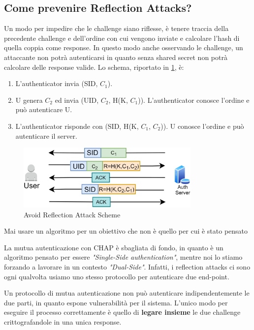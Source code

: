 \subsection{Come prevenire Reflection Attacks?}
Un modo per impedire che le challenge siano riflesse, è tenere traccia della precedente challenge e dell'ordine con cui vengono inviate e calcolare l'hash di quella coppia come response. In questo modo anche osservando le challenge, un attaccante non potrà autenticarsi in quanto senza shared secret non potrà calcolare delle response valide. Lo schema, riportato in \cref{fig:reflectionavoid}, è:
\begin{enumerate}
    \item L'authenticator invia (SID, $C_1$).
    \item U genera $C_2$ ed invia (UID, $C_2$, H(K, $C_1$)). L'authenticator conosce l'ordine e può autenticare U.
    \item L'authenticator risponde con (SID, H(K, $C_1$, $C_2$)). U conosce l'ordine e può autenticare il server.
\end{enumerate}
\begin{figure}[ht]
    \centering
    \includegraphics[width=0.8\textwidth]{image/reflectionavoid.png}
    \caption{Avoid Reflection Attack Scheme}
    \label{fig:reflectionavoid}
\end{figure}
\begin{corollary}
Mai usare un algoritmo per un obiettivo che non è quello per cui è stato pensato
\end{corollary}
La mutua autenticazione con CHAP è sbagliata di fondo, in quanto è un algoritmo pensato per essere \textit{"Single-Side authentication"}, mentre noi lo stiamo forzando a lavorare in un contesto \textit{"Dual-Side"}. Infatti, i reflection attacks ci sono ogni qualvolta usiamo uno stesso protocollo per autenticare due end-point. 
\begin{remark}
Un protocollo di mutua autenticazione non può autenticare indipendentemente le due parti, in quanto espone vulnerabilità per il sistema. L'unico modo per eseguire il processo correttamente è quello di \textbf{legare insieme} le due challenge crittografandole in una unica response.
\end{remark}
